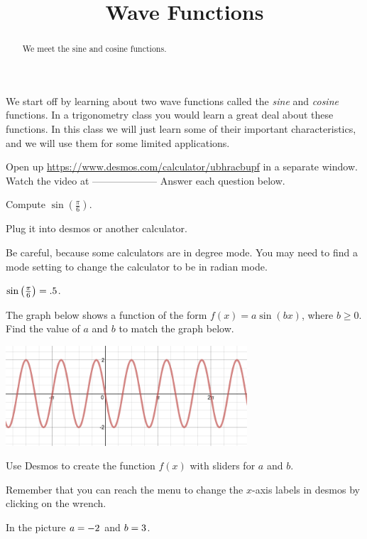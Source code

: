 \documentclass{ximera}
\title{Wave Functions}
\begin{document}
\begin{abstract}
We meet the sine and cosine functions.
\end{abstract}
\maketitle


We start off by learning about two wave functions called the \emph{sine} and \emph{cosine} functions. In a trigonometry class you would learn a great deal about these functions. In this class we will just learn some of their important characteristics, and we will use them for some limited applications.

Open up \url{https://www.desmos.com/calculator/ubhracbupf} in a separate window. Watch the video at  -------------------- Answer each question below.

\begin{exercise}
Compute $\sin\left(\frac{\pi}{6}\right)$.
\begin{solution} 
\begin{hint}
Plug it into desmos or another calculator. 
\end{hint}
\begin{hint}
Be careful, because some calculators are in degree mode. You may need to find a mode setting to change the calculator to be in radian mode.
\end{hint}
$\sin\left(\frac{\pi}{6}\right)={.5}$.
\end{solution}
\end{exercise}

\begin{question}
The graph below shows a function of the form $f(x)=a\sin(bx)$, where $b\ge0$. Find the value of $a$ and $b$ to match the graph below.
\begin{image}
\includegraphics[width=9cm]{mysterysine.png}
\end{image}
\begin{solution}
\begin{hint}
Use Desmos to create the function $f(x)$ with sliders for $a$ and $b$. 
\end{hint}
\begin{hint}
Remember that you can reach the menu to change the $x$-axis labels in desmos by clicking on the wrench.
\end{hint}
In the picture $a={-2}$ and $b={3}$.
\end{solution}
\end{question}
\end{document}
